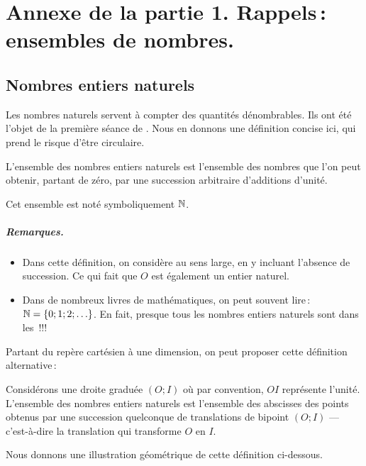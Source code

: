 \appendix

\chapter{Annexe de la partie 1. Rappels\,: ensembles de nombres.}\label{app_nbs}

	\section{Nombres entiers naturels}
		Les nombres naturels servent à compter des quantités dénombrables. Ils ont été l'objet de la première séance de . Nous en donnons une définition concise ici, qui prend le risque d'être circulaire.
		\begin{defi}
			L'ensemble des nombres entiers naturels est l'ensemble des nombres que l'on peut obtenir, partant de zéro, par une succession arbitraire d'additions d'unité.

			Cet ensemble est noté symboliquement $\mathbb{N}$.
		\end{defi}
		\paragraph{Remarques.} 

		\begin{itemize}[label=\textbullet]
			\item Dans cette définition, on considère  au sens large, en y incluant l'absence de succession. Ce qui fait que $O$ est également un entier naturel.
			\item Dans de nombreux livres de mathématiques, on peut souvent lire\,: $\mathbb{N}=\{0;1;2;\ldots\}$. En fait, presque tous les nombres entiers naturels sont dans les \guil{\ldots}\,!!! 
		\end{itemize}	


		Partant du repère cartésien à une dimension, on peut proposer cette définition alternative\,:
		\begin{defi}
			Considérons une droite graduée $(O;I)$ où par convention, $OI$ représente l'unité. L'ensemble des nombres entiers naturels est l'ensemble des abscisses des points obtenus par une succession quelconque de translations de bipoint $(O;I)$ --- c'est-à-dire la translation qui transforme $O$ en $I$.
		\end{defi}

		Nous donnons une illustration géométrique de cette définition ci-dessous.
		
